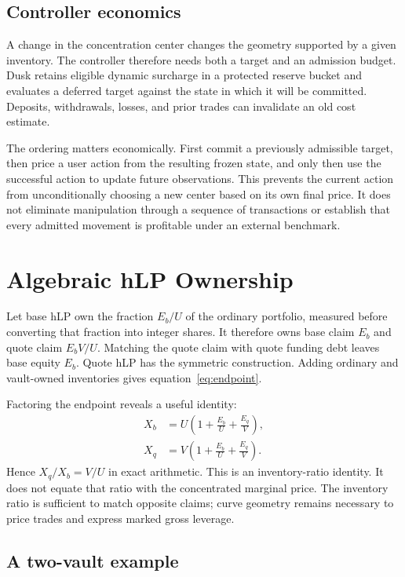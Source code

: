 \subsection{Controller economics}

A change in the concentration center changes the geometry supported by a given inventory. The controller therefore needs both a target and an admission budget. Dusk retains eligible dynamic surcharge in a protected reserve bucket and evaluates a deferred target against the state in which it will be committed. Deposits, withdrawals, losses, and prior trades can invalidate an old cost estimate.

The ordering matters economically. First commit a previously admissible target, then price a user action from the resulting frozen state, and only then use the successful action to update future observations. This prevents the current action from unconditionally choosing a new center based on its own final price. It does not eliminate manipulation through a sequence of transactions or establish that every admitted movement is profitable under an external benchmark.

\section{Algebraic hLP Ownership}
\label{app:hlp}

Let base hLP own the fraction $E_b/U$ of the ordinary portfolio, measured before converting that fraction into integer shares. It therefore owns base claim $E_b$ and quote claim $E_bV/U$. Matching the quote claim with quote funding debt leaves base equity $E_b$. Quote hLP has the symmetric construction. Adding ordinary and vault-owned inventories gives equation~\eqref{eq:endpoint}.

Factoring the endpoint reveals a useful identity:
\begin{align}
X_b&=U\left(1+\frac{E_b}{U}+\frac{E_q}{V}\right),\\
X_q&=V\left(1+\frac{E_b}{U}+\frac{E_q}{V}\right).
\end{align}
Hence $X_q/X_b=V/U$ in exact arithmetic. This is an inventory-ratio identity. It does not equate that ratio with the concentrated marginal price. The inventory ratio is sufficient to match opposite claims; curve geometry remains necessary to price trades and express marked gross leverage.

\subsection{A two-vault example}

